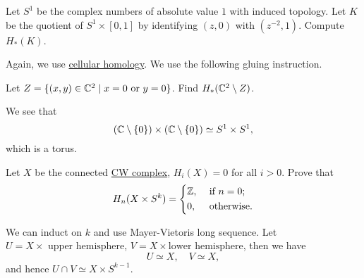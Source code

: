 \begin{exercise}[QR May 2017]
	Let \(S^1\) be the complex numbers of absolute value \(1\) with induced topology. Let \(K\) be the quotient of \(S^1 \times [0, 1]\) by identifying
	\((z, 0)\) with \((z^{-2}, 1 )\). Compute \(H_\ast (K)\).
\end{exercise}
\begin{answer}
	Again, we use \hyperref[def:cellular-homology-group]{cellular homology}. We use the following gluing instruction.
	\begin{figure}[H]
		\centering
		\label{fig:ans:ex-3:lec-40}
	\end{figure}
\end{answer}

\begin{exercise}[QR Sep. 2016]
	Let \(Z= \{(x, y)\in \mathbb{\MakeUppercase{c}} ^{2} \mid x = 0 \text{ or } y = 0\}\). Find \(H_\ast (\mathbb{\MakeUppercase{c}} ^{2} \setminus Z)\).
\end{exercise}
\begin{answer}
	We see that
	\[
		(\mathbb{\MakeUppercase{c}} \setminus \{0\})\times (\mathbb{\MakeUppercase{c}} \setminus \{0\}) \simeq S^1 \times S^1,
	\]
	which is a torus.
\end{answer}

\begin{exercise}[QR May 2017]
	Let \(X\) be the connected \hyperref[def:CW-Complex]{CW complex}, \(H_i(X) = 0\) for all \(i > 0\). Prove that
	\[
		H_n(X \times S^k) = \begin{dcases}
			\mathbb{\MakeUppercase{z}}, & \text{ if } n = 0; \\
			0,                          & \text{ otherwise}.
		\end{dcases}
	\]
\end{exercise}
\begin{answer}
	We can induct on \(k\) and use Mayer-Vietoris long sequence. Let \(U = X \times \text{ upper hemisphere}\), \(V = X \times \text{lower hemisphere}\), then we have
	\[
		U\simeq X,\quad V\simeq X,
	\]
	and hence \(U \cap V \simeq X \times S^{k-1}\).
\end{answer}